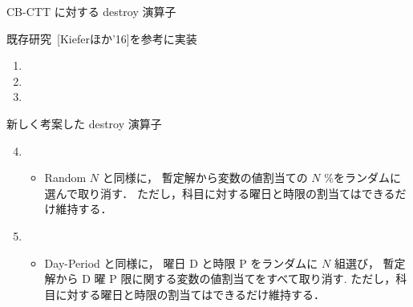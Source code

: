 \documentclass[11pt,dvipdfmx]{beamer}
\begin{document}
\begin{frame}{CB-CTT に対する destroy 演算子}
\begin{block}{既存研究~[Kieferほか'16]を参考に実装}
  \centering
    \begin{enumerate}
    \item {}
    \item {}
  \item {}
  \end{enumerate}
\end{block}
   
\begin{alertblock}{新しく考案した destroy 演算子}
 \begin{enumerate}
 \setcounter{enumi}{3}
  \item {}
   \begin{itemize}
    \item \small Random $N$ と同様に，
    暫定解から変数の値割当ての $N$ \%をランダムに選んで取り消す．
    ただし，科目に対する曜日と時限の割当てはできるだけ維持する．
   \end{itemize}
  \item {}
   \begin{itemize}
    \item \small Day-Period と同様に，
    曜日 D と時限 P をランダムに $N$ 組選び，
   暫定解から D 曜 P 限に関する変数の値割当てをすべて取り消す.
    ただし，科目に対する曜日と時限の割当てはできるだけ維持する．
   \end{itemize}
  \end{enumerate}
\end{alertblock}
\end{frame}
\end{document}

